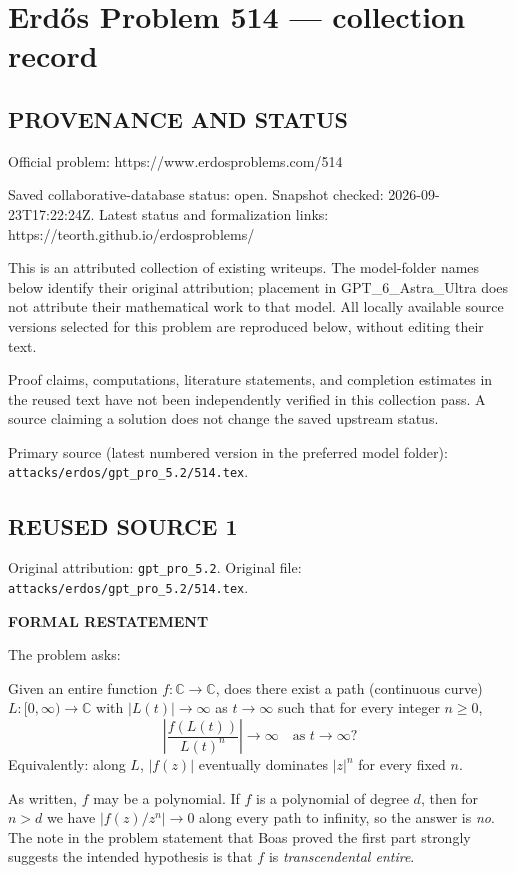 \section*{Erd\H{o}s Problem 514 --- collection record}

\subsection*{PROVENANCE AND STATUS}
Official problem: https://www.erdosproblems.com/514

Saved collaborative-database status: open.
Snapshot checked: 2026-09-23T17:22:24Z.
Latest status and formalization links: https://teorth.github.io/erdosproblems/

This is an attributed collection of existing writeups. The model-folder names below identify their original attribution; placement in GPT\_6\_Astra\_Ultra does not attribute their mathematical work to that model. All locally available source versions selected for this problem are reproduced below, without editing their text.

Proof claims, computations, literature statements, and completion estimates in the reused text have not been independently verified in this collection pass. A source claiming a solution does not change the saved upstream status.

Primary source (latest numbered version in the preferred model folder): \texttt{attacks/erdos/gpt\_pro\_5.2/514.tex}.

\subsection*{REUSED SOURCE 1}
Original attribution: \texttt{gpt\_pro\_5.2}.
Original file: \texttt{attacks/erdos/gpt\_pro\_5.2/514.tex}.

\noindent\textbf{FORMAL RESTATEMENT}

The problem asks:

Given an entire function $f:\mathbb{C}\to\mathbb{C}$, does there exist a path (continuous curve) $L:[0,\infty)\to\mathbb{C}$ with $|L(t)|\to\infty$ as $t\to\infty$ such that for every integer $n\ge 0$,
\[
\left|\frac{f(L(t))}{L(t)^n}\right|\to\infty\quad\text{as }t\to\infty?
\]
Equivalently: along $L$, $|f(z)|$ eventually dominates $|z|^n$ for every fixed $n$.

\medskip
As written, $f$ may be a polynomial. If $f$ is a polynomial of degree $d$, then for $n>d$ we have $|f(z)/z^n|\to 0$ along every path to infinity, so the answer is \emph{no}. The note in the problem statement that Boas proved the first part strongly suggests the intended hypothesis is that $f$ is \emph{transcendental entire}.

